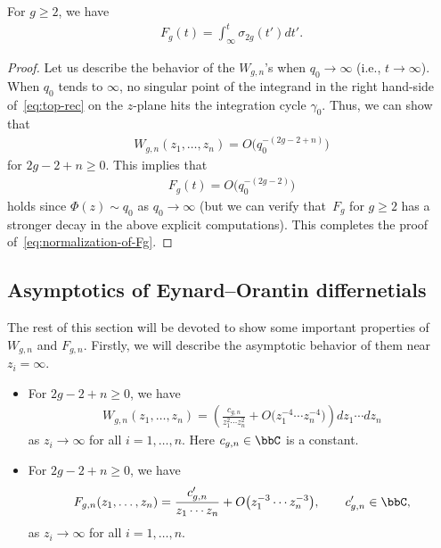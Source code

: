\begin{prop}
For $g \ge 2$, we have
\begin{gather} \label{eq:normalization-of-Fg}
F_{g}(t) = \int^{t}_{\infty} \sigma_{2g}(t')dt'.
\end{gather}
\end{prop}

\begin{proof}
Let us describe the behavior of the  $W_{g,n}$'s when
$q_{0} \rightarrow \infty$ (i.e., $t \rightarrow \infty$).
When $q_{0}$ tends to $\infty$,
no singular point of the integrand in the right hand-side of~\eqref{eq:top-rec}
on the $z$-plane hits the integration cycle $\gamma_{0}$.
Thus, we can show that
\begin{gather*}
W_{g,n}(z_{1},\dots,z_{n}) = O\big(q_{0}^{-(2g-2+n)}\big)
\end{gather*}
for $2g-2+n \ge 0$. This implies that
\begin{gather*}
F_{g}(t) = O\big(q_{0}^{-(2g-2)}\big)
\end{gather*}
holds since $\Phi(z) \sim q_{0}$ as $q_{0} \rightarrow \infty$
(but we can verify that~$F_{g}$ for $g \ge 2$
has a stronger decay in the above explicit computations).
This completes the proof of~\eqref{eq:normalization-of-Fg}.
\end{proof}


\subsection{Asymptotics of Eynard--Orantin dif\/fernetials}
\label{section:asymptotics-Wgn}

The rest of this section will be devoted to
show some important properties of $W_{g,n}$ and $F_{g,n}$.
Firstly, we will describe the asymptotic behavior
of them near $z_{i} = \infty$.

\begin{lem} \label{lem:decay-Wgn-Fgn}\quad
\begin{itemize}\itemsep=0pt
\item[$(i)$]
For $2g-2+n \ge 0$, we have
\begin{gather} \label{eq:asympt-Wgn}
W_{g,n}(z_{1},\dots,z_{n}) =
\left(\frac{c_{g,n}}{z_{1}^{2}\cdots z_{n}^{2}}
+ O\big(z_{1}^{-4}\cdots z_{n}^{-4}\big) \right)dz_{1}\cdots dz_{n}
\end{gather}
as $z_{i} \rightarrow \infty$ for all $i=1,\dots,n$.
Here $c_{g,n} \in \bbC$ is a constant.
\item[$(ii)$] %
For $2g-2+n \ge 0$, we have
\begin{gather} \label{eq:asympt-Fgn}
F_{g,n}(z_{1},\dots,z_{n}) =
\frac{c'_{g,n}}{z_{1}\cdots z_{n}} +
O\big(z_{1}^{-3}\cdots z_{n}^{-3}\big), \qquad
c'_{g,n} \in \bbC,
\end{gather}
as $z_{i} \rightarrow \infty$ for all $i=1,\dots,n$.
\end{itemize}
\end{lem}

